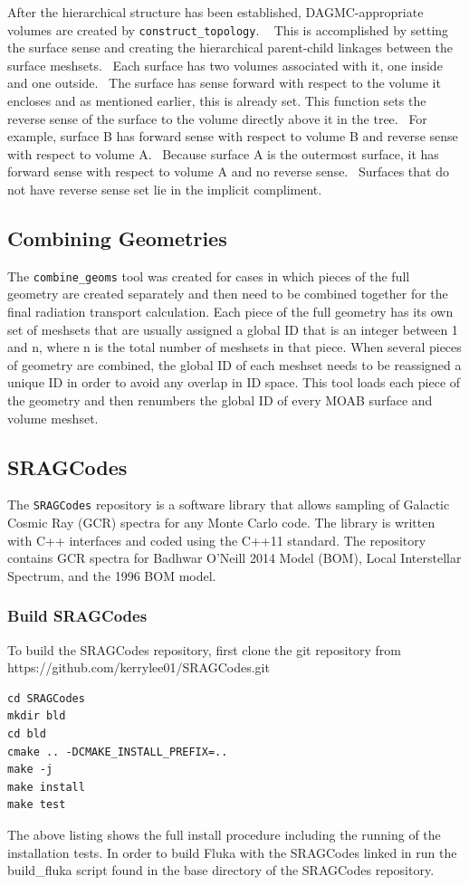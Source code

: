 After the hierarchical structure has been established, DAGMC-appropriate volumes are created by \texttt{construct\_topology}.  
This is accomplished by setting the surface sense and creating the hierarchical parent-child linkages between the 
surface meshsets.  Each surface has two volumes associated with it, one inside and one outside.  The surface has 
sense forward with respect to the volume it encloses and as mentioned earlier, this is already set. This function sets 
the reverse sense of the surface to the volume directly above it in the tree.  For example, surface B has forward 
sense with respect to volume B and reverse sense with respect to volume A.  Because surface A is the outermost surface, 
it has forward sense with respect to volume A and no reverse sense.  Surfaces that do not have reverse sense set lie in the 
implicit compliment.

\subsection{Combining Geometries}
The \texttt{combine\_geoms} tool \cite{combine} was created for cases in which pieces of the full geometry are created
separately and then need to be combined together for the final radiation transport
calculation.  Each piece of the full geometry has its own set of meshsets that are usually assigned a global ID
that is an integer between 1 and n, where n is the total number of 
meshsets in that piece.  When several pieces of geometry are combined, the global ID of each
meshset needs to be reassigned a unique ID in order to avoid any overlap in ID space.  This tool loads each piece of
the geometry and then renumbers the global ID of every MOAB surface and volume meshset.


\subsection{SRAGCodes}
\label{sec:sragcodes}
The \texttt{SRAGCodes} repository is a software library that allows sampling of Galactic Cosmic Ray (GCR)
spectra for any Monte Carlo code. The library is written with C++ interfaces and coded using the C++11 
standard. The repository contains GCR spectra for Badhwar O'Neill 2014 Model (BOM), Local Interstellar Spectrum, and
the 1996 BOM model.

\subsubsection*{Build SRAGCodes}
To build the SRAGCodes repository, first clone the git repository from https://github.com/kerrylee01/SRAGCodes.git
\lstset{language=bash} 
\begin{lstlisting}
cd SRAGCodes
mkdir bld
cd bld
cmake .. -DCMAKE_INSTALL_PREFIX=..
make -j
make install
make test
\end{lstlisting}
The above listing shows the full install procedure including the running of the installation tests. In order to build
Fluka with the SRAGCodes linked in run the build\_fluka script found in the base directory of the SRAGCodes repository.

